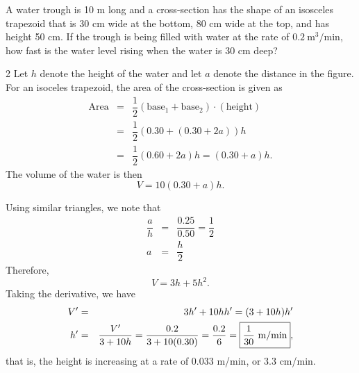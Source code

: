 \documentclass{book}
\begin{document}
\begin{Exam}
A water trough is 10 m long and a cross-section has the shape of an isosceles trapezoid that is 30 cm wide at the bottom, 80 cm wide at the top, and has height 50 cm. If the trough is being filled with water at the rate of $0.2\  \text{m}^3/\text{min}$, how fast is the water level rising when the water is 30 cm deep?
\begin{multicols}{2}
Let $h$ denote the height of the water and let $a$ denote the distance in the figure. For an isoceles trapezoid, the area of the cross-section is given as 
\begin{eqnarray*}
\text{Area} &=& \dfrac{1}{2}(\text{base}_1 + \text{base}_2)\cdot(\text{height})\\
 &=& \dfrac{1}{2}(0.30 + (0.30+2a))h\\
 &=& \dfrac{1}{2}(0.60+2a)h = (0.30+a)h.
 \end{eqnarray*} The volume of the water is then \[V = 10(0.30+a)h.\] 

 \begin{center}
\end{center}
\end{multicols}
Using similar triangles, we note that 
\begin{eqnarray*} 
\dfrac{a}{h} &=& \dfrac{0.25}{0.50} = \dfrac{1}{2}\\
a &=& \dfrac{h}{2}
\end{eqnarray*}   Therefore, 
\[V = 3h + 5h^2.\] Taking the derivative, we have 
\begin{eqnarray*}
V' &=& 3h' + 10hh' = (3+10h)h'\\
h' &=& \dfrac{V'}{3+10h} = \dfrac{0.2}{3+10(0.30)} = \dfrac{0.2}{6} = \fbox{$\dfrac{1}{30}$ m/min},
\end{eqnarray*} that is, the height is increasing at a rate of 0.033 m/min, or 3.3 cm/min.
\end{Exam}\vs
\end{document}
